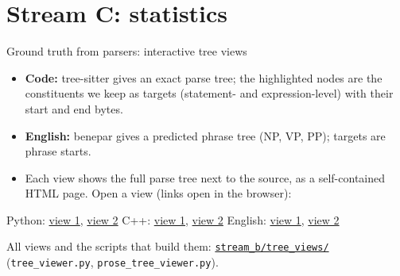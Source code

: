\documentclass[aspectratio=169,11pt]{beamer}
\begin{document}
\section{Stream C: statistics}
\begin{frame}{Ground truth from parsers: interactive tree views}
\begin{itemize}
\item \textbf{Code:} tree-sitter gives an exact parse tree; the highlighted nodes are the constituents we keep as targets (statement- and expression-level) with their start and end bytes.
\item \textbf{English:} benepar gives a predicted phrase tree (NP, VP, PP); targets are phrase starts.
\item Each view shows the full parse tree next to the source, as a self-contained HTML page. Open a view (links open in the browser):
\end{itemize}
\begin{center}
Python: \href{https://htmlpreview.github.io/?https://github.com/dawnbliss-coder/ESCAPE-Entropy-Semantic-Compute-Allocation-in-Programming-Environments/blob/main/stream_b/tree_views/py_a1567fe2419b.html}{view 1}, \href{https://htmlpreview.github.io/?https://github.com/dawnbliss-coder/ESCAPE-Entropy-Semantic-Compute-Allocation-in-Programming-Environments/blob/main/stream_b/tree_views/py_759ab0d95fd8.html}{view 2} \quad C++: \href{https://htmlpreview.github.io/?https://github.com/dawnbliss-coder/ESCAPE-Entropy-Semantic-Compute-Allocation-in-Programming-Environments/blob/main/stream_b/tree_views/cpp_b91a1e2f74f9.html}{view 1}, \href{https://htmlpreview.github.io/?https://github.com/dawnbliss-coder/ESCAPE-Entropy-Semantic-Compute-Allocation-in-Programming-Environments/blob/main/stream_b/tree_views/cpp_362b99d47547.html}{view 2} \quad English: \href{https://htmlpreview.github.io/?https://github.com/dawnbliss-coder/ESCAPE-Entropy-Semantic-Compute-Allocation-in-Programming-Environments/blob/main/stream_b/tree_views/prose_504f378c8948.html}{view 1}, \href{https://htmlpreview.github.io/?https://github.com/dawnbliss-coder/ESCAPE-Entropy-Semantic-Compute-Allocation-in-Programming-Environments/blob/main/stream_b/tree_views/prose_66faa3d56bc3.html}{view 2}
\end{center}
{\footnotesize All views and the scripts that build them: \href{https://github.com/dawnbliss-coder/ESCAPE-Entropy-Semantic-Compute-Allocation-in-Programming-Environments/tree/main/stream_b/tree_views}{\texttt{stream\_b/tree\_views/}} (\texttt{tree\_viewer.py}, \texttt{prose\_tree\_viewer.py}).}
\end{frame}
\end{document}
